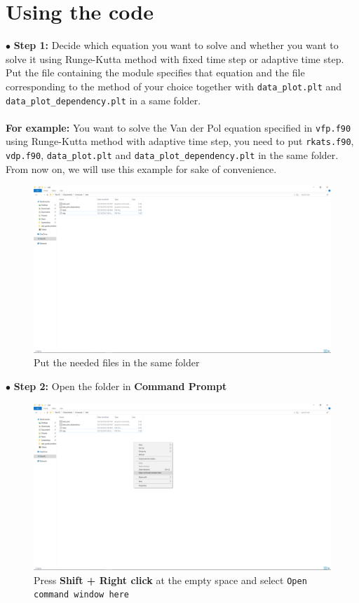 \documentclass{article}
\begin{document}
	\section{Using the code}
	$\bullet$ \textbf{Step 1:} Decide which equation you want to solve and whether you want to solve it using Runge-Kutta method with fixed time step or adaptive time step. Put the file containing the module specifies that equation and the file corresponding to the method of your choice together with \texttt{data\_plot.plt} and \texttt{data\_plot\_dependency.plt} in a same folder.\\\\
	\textbf{For example:} You want to solve the Van der Pol equation specified in \texttt{vfp.f90} using Runge-Kutta method with adaptive time step, you need to put \texttt{rkats.f90}, \texttt{vdp.f90}, \texttt{data\_plot.plt} and \texttt{data\_plot\_dependency.plt} in the same folder. From now on, we will use this example for sake of convenience.
	\begin{figure}[H]
		\centering	\includegraphics[width=15cm]{fig1}
		\caption{Put the needed files in the same folder}
	\end{figure}
	\noindent$\bullet$ \textbf{Step 2:} Open the folder in \textbf{Command Prompt}
	\begin{figure}[H]
		\centering	\includegraphics[width=15cm]{fig2}
		\caption{Press \textbf{Shift + Right click} at the empty space and select \texttt{Open command window here}}
	\end{figure}
\end{document}
